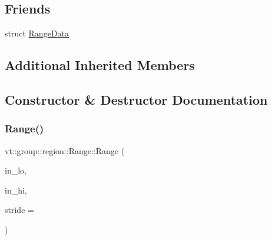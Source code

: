 \subsection*{Friends}
\begin{DoxyCompactItemize}
\item 
struct \hyperlink{structvt_1_1group_1_1region_1_1_range_a2a3990246b3bab9c29636b30aa9741ac}{Range\+Data}
\end{DoxyCompactItemize}
\subsection*{Additional Inherited Members}


\subsection{Constructor \& Destructor Documentation}
\mbox{\label{structvt_1_1group_1_1region_1_1_range_a6691cd13c504bdabbb67129f652b816a}} 
\subsubsection{\texorpdfstring{Range()}{Range()}\hspace{0.1cm}{\footnotesize\ttfamily [1/4]}}
{\footnotesize\ttfamily vt\+::group\+::region\+::\+Range\+::\+Range (\begin{DoxyParamCaption}\item[{\hyperlink{structvt_1_1group_1_1region_1_1_region_abf426ff85bed72c1c6524fad6a9f1751}{Bound\+Type} const \&}]{in\+\_\+lo,  }\item[{\hyperlink{structvt_1_1group_1_1region_1_1_region_abf426ff85bed72c1c6524fad6a9f1751}{Bound\+Type} const \&}]{in\+\_\+hi,  }\item[{\hyperlink{structvt_1_1group_1_1region_1_1_region_abf426ff85bed72c1c6524fad6a9f1751}{Bound\+Type} const \&}]{stride = {} }\end{DoxyParamCaption})}

\mbox{\label{structvt_1_1group_1_1region_1_1_range_a9cd7425570ad25a2d5faf70b5f233bbd}} 
